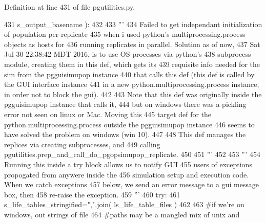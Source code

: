 Definition at line 431 of file pgutilities.\+py.


\begin{DoxyCode}
431             s\_output\_basename ):
432 
433     \textcolor{stringliteral}{'''}
434 \textcolor{stringliteral}{    Failed to get independant initialization of population per-replicate}
435 \textcolor{stringliteral}{    when i used python's multiprocessing.process objects as hosts for }
436 \textcolor{stringliteral}{    running replicates in parallel.  Solution as of now, }
437 \textcolor{stringliteral}{    Sat Jul 30 22:38:42 MDT 2016, is to use OS processes via python's }
438 \textcolor{stringliteral}{    subprocess module, creating them in this def, which gets its}
439 \textcolor{stringliteral}{    requisite info needed for the sim from the pgguisimupop instance}
440 \textcolor{stringliteral}{    that calls this def (this def is called by the GUI interface instance}
441 \textcolor{stringliteral}{    in a new python.multiprocessing.process instance, in order not to block the gui).}
442 \textcolor{stringliteral}{}
443 \textcolor{stringliteral}{    Note that this def was originally inside the pgguisimupop instance that calls it,}
444 \textcolor{stringliteral}{    but on windows there was a pickling error not seen on linux or Mac.  Moving this}
445 \textcolor{stringliteral}{    target def for the python.multiprocessing.process outside the pgguisimupop instance}
446 \textcolor{stringliteral}{    seems to have solved the problem on windows (win 10).}
447 \textcolor{stringliteral}{}
448 \textcolor{stringliteral}{    This def manages the replices via creating subprocesses, and }
449 \textcolor{stringliteral}{    calling pgutilities.prep\_and\_call\_do\_pgopsimupop\_replicate.}
450 \textcolor{stringliteral}{}
451 \textcolor{stringliteral}{    '''} 
452 
453     \textcolor{stringliteral}{''' }
454 \textcolor{stringliteral}{    Running this inside a try block allows us to notify GUI}
455 \textcolor{stringliteral}{    users of exceptions propogated from anywere inside the }
456 \textcolor{stringliteral}{    simulation setup and execution code. When we catch exceptions }
457 \textcolor{stringliteral}{    below, we send an error message to a gui message box, then}
458 \textcolor{stringliteral}{    re-raise the exception. }
459 \textcolor{stringliteral}{    '''}
460     \textcolor{keywordflow}{try}:
461         s\_life\_tables\_stringified=\textcolor{stringliteral}{","}.join( ls\_life\_table\_files )
462 
463         \textcolor{comment}{#if we're on windows, out strings of file}
464         \textcolor{comment}{#paths may be a mangled mix of unix and }

\end{DoxyCode}
